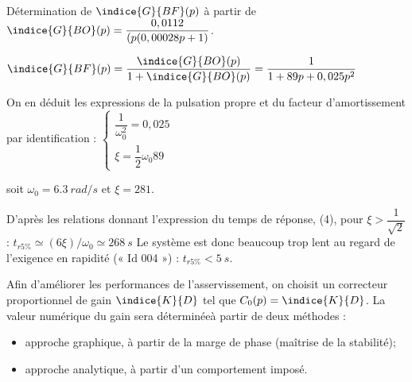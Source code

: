 \ifprof
\begin{corrige}%
Détermination de $\indice{G}{BF} (p)$ à partir de $\indice{G}{BO} (p)=\dfrac{0,0112}{(p(0,00028p+1)} $.

$\indice{G}{BF} (p) = \dfrac{\indice{G}{BO} (p)}{1+\indice{G}{BO} (p)} = \dfrac{1}{1+89 p + 0,025 p^2}$


On en déduit les expressions de la pulsation propre et du facteur d’amortissement par identification :
$
\left\{
\begin{array}{l}
\dfrac{1}{\omega_0^2} = 0,025 \\
\xi = \dfrac{1}{2}\omega_0 89
\end{array}
\right.$

 soit $\omega_0 = \SI{6,3}{rad/s}$ et $\xi =281$.
 
D’après les relations donnant l’expression du temps de réponse, (4), pour $\xi >\dfrac{1}{\sqrt{2}}$ : $t_{r5\%}\simeq(6 \xi)/\omega_0 \simeq \SI{268}{s}$
Le système est donc beaucoup trop lent au regard de l’exigence en rapidité (« Id 004 ») : 
$t_{r5\%}<\SI{5}{s}$.

\end{corrige}
\else
\fi
\ifprof
\else
Afin d’améliorer les performances de l’asservissement, on choisit un correcteur proportionnel de gain 
$\indice{K}{D}$ tel que $C_0(p) = \indice{K}{D}$. La valeur numérique du gain sera déterminéeà partir de deux méthodes :
\begin{itemize}
\item approche graphique, à partir de la marge de phase (maîtrise de la stabilité);
\item approche analytique, à partir d’un comportement imposé.
\end{itemize}
\fi

